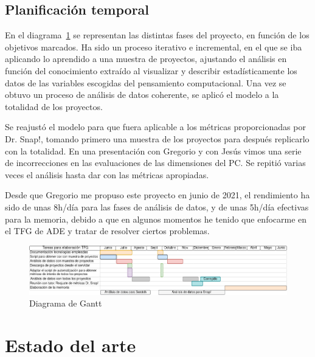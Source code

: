 \documentclass[a4paper, 12pt]{book}
\begin{document}
\section{Planificación temporal}
\label{sec:planificacion-temporal}

En el diagrama~\ref{fig:gantt} se representan las distintas fases del proyecto, en función de los objetivos marcados. Ha sido un proceso iterativo e incremental, en el que se iba aplicando lo aprendido a una muestra de proyectos, ajustando el análisis en función del conocimiento extraído al visualizar y describir estadísticamente los datos de las variables escogidas del pensamiento computacional. Una vez se obtuvo un proceso de análisis de datos coherente, se aplicó el modelo a la totalidad de los proyectos.

Se reajustó el modelo para que fuera aplicable a los métricas proporcionadas por Dr. Snap!, tomando primero una muestra de los proyectos para después replicarlo con la totalidad. En una presentación con Gregorio y con Jesús vimos una serie de incorrecciones en las evaluaciones de las dimensiones del PC. Se repitió varias veces el análisis hasta dar con las métricas apropiadas. 

Desde que Gregorio me propuso este proyecto en junio de 2021, el rendimiento ha sido de unas 8h/día para las fases de análisis de datos, y de unas 5h/día efectivas para la memoria, debido a que en algunos momentos he tenido que enfocarme en el TFG de ADE y tratar de resolver ciertos problemas.

\begin{figure}[H]
    \centering
    \includegraphics[width=\textwidth]{img/gantt}
    \caption{Diagrama de Gantt}
    \label{fig:gantt}
\end{figure}


\cleardoublepage
\chapter{Estado del arte}
\label{chap:estado}
\end{document}
